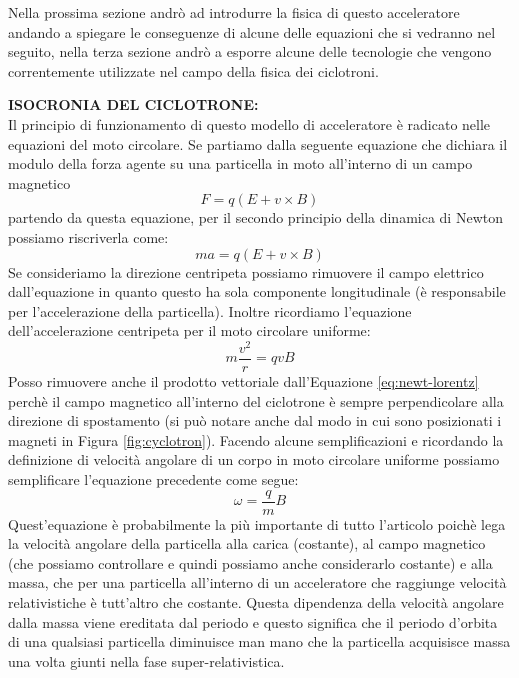 \documentclass[a4paper,10pt]{article}
\begin{document}
Nella prossima sezione andrò ad introdurre la fisica di questo acceleratore andando a spiegare le
conseguenze di alcune delle equazioni che si vedranno nel seguito, nella terza sezione andrò a
esporre alcune delle tecnologie che vengono correntemente utilizzate nel campo della fisica dei
ciclotroni.

\bigskip
{}
\makeatletter{}\makeatother
\label{sec:cyclotron}
\noindent
\textbf{ISOCRONIA DEL CICLOTRONE:}
\\
Il principio di funzionamento di questo modello di acceleratore è radicato nelle equazioni del moto
circolare. Se partiamo dalla seguente equazione che dichiara il modulo della forza agente su una
particella in moto all'interno di un campo magnetico
\begin{equation}
	F = q (E + v \times B)
\end{equation}
partendo da questa equazione, per il secondo principio della dinamica di Newton possiamo riscriverla
come:
\begin{equation}
	m a = q (E + v \times B) \label{eq:newt-lorentz}
\end{equation}
Se consideriamo la direzione centripeta possiamo rimuovere il campo elettrico dall'equazione in
quanto questo ha sola componente longitudinale (è responsabile per l'accelerazione della
particella). Inoltre ricordiamo l'equazione dell'accelerazione centripeta per il moto circolare
uniforme:
\begin{equation}
	m \frac{v^2}{r} = q v B
\end{equation}
Posso rimuovere anche il prodotto vettoriale dall'Equazione \ref{eq:newt-lorentz} perchè il campo
magnetico all'interno del ciclotrone è sempre perpendicolare alla direzione di spostamento (si può
notare anche dal modo in cui sono posizionati i magneti in Figura \ref{fig:cyclotron}). Facendo
alcune semplificazioni e ricordando la definizione di velocità angolare di un corpo in moto
circolare uniforme possiamo semplificare l'equazione precedente come segue:
\begin{equation}
	\omega = \frac{q}{m}B \label{eq:an-speed}
\end{equation}
Quest'equazione è probabilmente la più importante di tutto l'articolo poichè lega la velocità
angolare della particella alla carica (costante), al campo magnetico (che possiamo controllare e
quindi possiamo anche considerarlo costante) e alla massa, che per una particella all'interno di un
acceleratore che raggiunge velocità relativistiche è tutt'altro che costante. Questa dipendenza
della velocità angolare dalla massa viene ereditata dal periodo e questo significa che il periodo
d'orbita di una qualsiasi particella diminuisce man mano che la particella acquisisce massa una
volta giunti nella fase super-relativistica.
\end{document}
